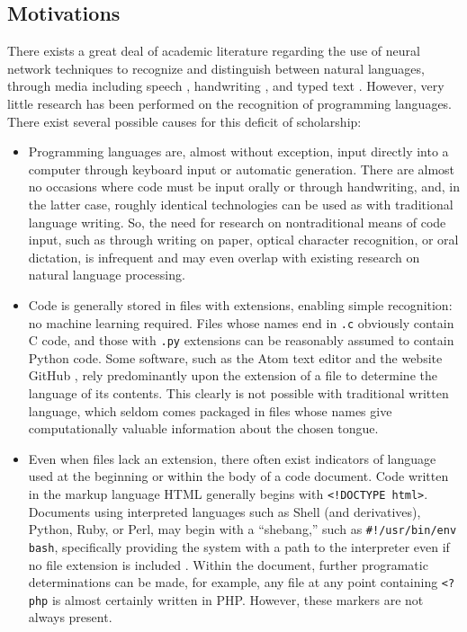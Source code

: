\documentclass{article}
\begin{document}
\subsection{Motivations}
There exists a great deal of academic literature regarding the use of neural network techniques to recognize and distinguish between natural languages, through media including speech \cite{rnnspoken}\cite{dcrnnspoken}, handwriting \cite{handwritingex}, and typed text \cite{langidnn}\cite{langidstanford}. However, very little research has been performed on the recognition of programming languages. There exist several possible causes for this deficit of scholarship:
\begin{itemize}
    \item{Programming languages are, almost without exception, input directly into a computer through keyboard input or automatic generation. There are almost no occasions where code must be input orally or through handwriting, and, in the latter case, roughly identical technologies can be used as with traditional language writing. So, the need for research on nontraditional means of code input, such as through writing on paper, optical character recognition, or oral dictation, is infrequent and may even overlap with existing research on natural language processing.}
    \item{Code is generally stored in files with extensions, enabling simple recognition: no machine learning required. Files whose names end in \texttt{.c} obviously contain C code, and those with \texttt{.py} extensions can be reasonably assumed to contain Python code. Some software, such as the Atom text editor and the website GitHub \cite{githubid}, rely predominantly upon the extension of a file to determine the language of its contents. This clearly is not possible with traditional written language, which seldom comes packaged in files whose names give computationally valuable information about the chosen tongue.}
    \item{Even when files lack an extension, there often exist indicators of language used at the beginning or within the body of a code document. Code written in the markup language HTML generally begins with \texttt{<!DOCTYPE html>}. Documents using interpreted languages such as Shell (and derivatives), Python, Ruby, or Perl, may begin with a ``shebang,'' such as \texttt{#!/usr/bin/env bash}, specifically providing the system with a path to the interpreter even if no file extension is included \cite{shebang}. Within the document, further programatic determinations can be made, for example, any file at any point containing \texttt{<?php} is almost certainly written in PHP. However, these markers are not always present.}
\end{itemize}
\end{document}
